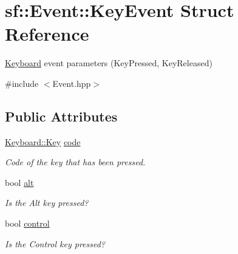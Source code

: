 \hypertarget{structsf_1_1_event_1_1_key_event}{}\section{sf\+:\+:Event\+:\+:Key\+Event Struct Reference}
\label{structsf_1_1_event_1_1_key_event}


\mbox{\hyperlink{classsf_1_1_keyboard}{Keyboard}} event parameters (Key\+Pressed, Key\+Released)  




{\ttfamily \#include $<$Event.\+hpp$>$}

\subsection*{Public Attributes}
\begin{DoxyCompactItemize}
\item 
\mbox{\label{structsf_1_1_event_1_1_key_event_a2879fdab8a68cb1c6ecc45730a2d0e61}} 
\mbox{\hyperlink{classsf_1_1_keyboard_acb4cacd7cc5802dec45724cf3314a142}{Keyboard\+::\+Key}} \mbox{\hyperlink{structsf_1_1_event_1_1_key_event_a2879fdab8a68cb1c6ecc45730a2d0e61}{code}}
\begin{DoxyCompactList}\small\item\em Code of the key that has been pressed. \end{DoxyCompactList}\item 
\mbox{\label{structsf_1_1_event_1_1_key_event_a915a483317de67d995188a855701fbd7}} 
bool \mbox{\hyperlink{structsf_1_1_event_1_1_key_event_a915a483317de67d995188a855701fbd7}{alt}}
\begin{DoxyCompactList}\small\item\em Is the Alt key pressed? \end{DoxyCompactList}\item 
\mbox{\label{structsf_1_1_event_1_1_key_event_a9255861c2f88501d80ad6b44a310b62f}} 
bool \mbox{\hyperlink{structsf_1_1_event_1_1_key_event_a9255861c2f88501d80ad6b44a310b62f}{control}}
\begin{DoxyCompactList}\small\item\em Is the Control key pressed? \end{DoxyCompactList}\item 

\end{DoxyCompactItemize}
